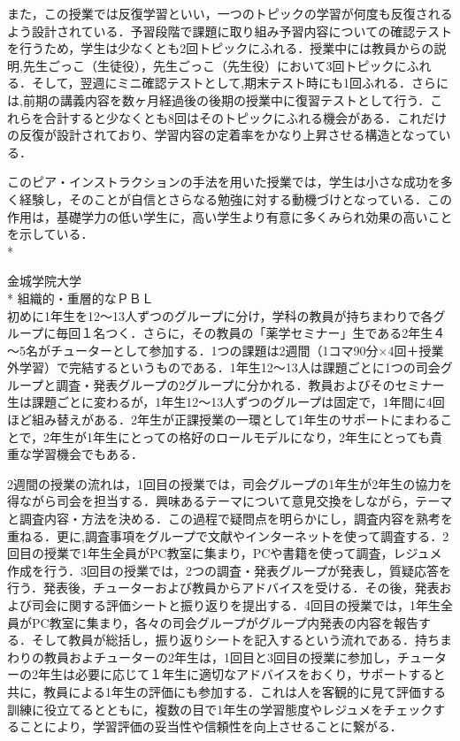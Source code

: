 また，この授業では反復学習といい，一つのトピックの学習が何度も反復されるよう設計されている．予習段階で課題に取り組み予習内容についての確認テストを行うため，学生は少なくとも2回トピックにふれる．授業中には教員からの説明,先生ごっこ（生徒役），先生ごっこ（先生役）において3回トピックにふれる．そして，翌週にミニ確認テストとして,期末テスト時にも1回ふれる．さらには,前期の講義内容を数ヶ月経過後の後期の授業中に復習テストとして行う．これらを合計すると少なくとも8回はそのトピックにふれる機会がある．これだけの反復が設計されており、学習内容の定着率をかなり上昇させる構造となっている．

このピア・インストラクションの手法を用いた授業では，学生は小さな成功を多く経験し，そのことが自信とさらなる勉強に対する動機づけとなっている．この作用は，基礎学力の低い学生に，高い学生より有意に多くみられ効果の高いことを示している．\vspace{0.3in} \\*

金城学院大学\vspace{0.2in} \\*
組織的・重層的なＰＢＬ\\
初めに1年生を12～13人ずつのグループに分け，学科の教員が持ちまわりで各グループに毎回１名つく．さらに，その教員の「薬学セミナー」生である2年生４～5名がチューターとして参加する．1つの課題は2週間（1コマ90分×4回＋授業外学習）で完結するというものである．1年生12～13人は課題ごとに1つの司会グループと調査・発表グループの2グループに分かれる．教員およびそのセミナー生は課題ごとに変わるが，1年生12～13人ずつのグループは固定で，1年間に4回ほど組み替えがある．2年生が正課授業の一環として1年生のサポートにまわることで，2年生が1年生にとっての格好のロールモデルになり，2年生にとっても貴重な学習機会でもある．

2週間の授業の流れは，1回目の授業では，司会グループの1年生が2年生の協力を得ながら司会を担当する．興味あるテーマについて意見交換をしながら，テーマと調査内容・方法を決める．この過程で疑問点を明らかにし，調査内容を熟考を重ねる．更に,調査事項をグループで文献やインターネットを使って調査する．2回目の授業で1年生全員がPC教室に集まり，PCや書籍を使って調査，レジュメ作成を行う．3回目の授業では，2つの調査・発表グループが発表し，質疑応答を行う．発表後，チューターおよび教員からアドバイスを受ける．その後，発表および司会に関する評価シートと振り返りを提出する．4回目の授業では，1年生全員がPC教室に集まり，各々の司会グループがグループ内発表の内容を報告する．そして教員が総括し，振り返りシートを記入するという流れである．持ちまわりの教員およチューターの2年生は，1回目と3回目の授業に参加し，チューターの2年生は必要に応じて１年生に適切なアドバイスをおくり，サポートすると共に，教員による1年生の評価にも参加する．これは人を客観的に見て評価する訓練に役立てるとともに，複数の目で1年生の学習態度やレジュメをチェックすることにより，学習評価の妥当性や信頼性を向上させることに繋がる．

